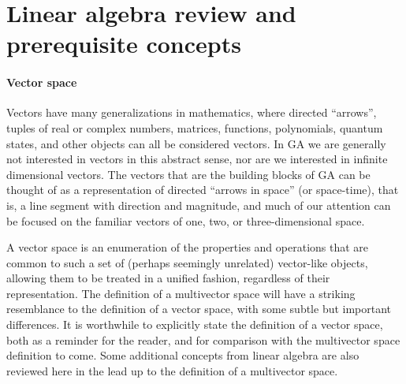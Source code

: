 \section{Linear algebra review and prerequisite concepts}

\paragraph{Vector space}

Vectors have many generalizations in mathematics, where directed ``arrows'', tuples of real or complex numbers, matrices, functions, polynomials, quantum states, and other objects can all be considered vectors.
In GA we are generally not interested in vectors in this abstract sense,
nor are we interested in infinite dimensional vectors.
The vectors that are the building blocks of GA can be thought of as a representation of directed ``arrows in space'' (or space-time), that is, a line segment with direction and magnitude, and much of our attention can be focused on the familiar vectors of one, two, or three-dimensional space.
% 

A vector space is an enumeration of the properties and operations that are common to such a set of (perhaps seemingly unrelated) vector-like objects, allowing them to be treated in a unified fashion, regardless of their representation.
The definition of a multivector space will have a striking resemblance to the definition of a vector space, with some subtle but important differences.
It is worthwhile to explicitly state the definition of a vector space, both as a reminder for the reader, and for comparison with the multivector space definition to come.
Some additional concepts from linear algebra are also reviewed here in the lead up to the definition of a multivector space.


